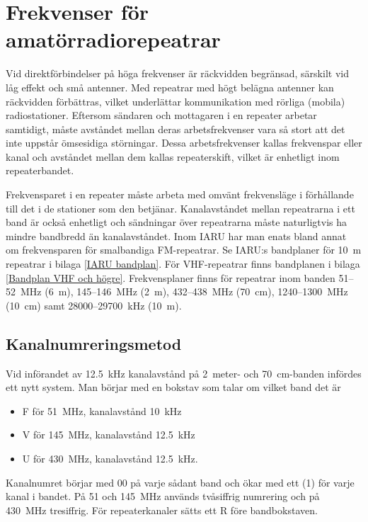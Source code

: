 \chapter[Svenska repeatrar]{Frekvenser för amatörradiorepeatrar}
\label{svenska repeatrar}

Vid direktförbindelser på höga frekvenser är räckvidden begränsad,
särskilt vid låg effekt och små antenner.
Med repeatrar med högt belägna antenner kan räckvidden förbättras,
vilket underlättar kommunikation med rörliga (mobila) radiostationer.
Eftersom sändaren och mottagaren i en repeater arbetar samtidigt, måste
avståndet mellan deras arbetsfrekvenser vara så stort att det inte uppstår
ömsesidiga störningar.
Dessa arbetsfrekvenser kallas frekvenspar eller kanal och avståndet mellan dem
kallas repeaterskift, vilket är enhetligt inom repeaterbandet.

Frekvensparet i en repeater måste arbeta med omvänt frekvensläge i förhållande
till det i de stationer som den betjänar.
Kanalavståndet mellan repeatrarna i ett band är också enhetligt och sändningar
över repeatrarna måste naturligtvis ha mindre bandbredd än kanalavståndet.
Inom IARU har man enats bland annat om frekvensparen för smalbandiga
FM-repeatrar.
Se IARU:s bandplaner för 10~m repeatrar i bilaga \ref{IARU bandplan}.
För VHF-repeatrar finns bandplanen i bilaga \ref{Bandplan VHF och högre}.
Frekvensplaner finns för repeatrar inom banden 51--52~MHz (6~m), 145--146~MHz
(2~m), 432--438~MHz (70~cm), 1240--1300~MHz (10~cm) samt 28000--29700~kHz (10~m).

\section{Kanalnumreringsmetod}
Vid införandet av \SI{12,5}{\kilo\hertz} kanalavstånd på 2~meter- och
70~cm-banden infördes ett nytt system.
Man börjar med en bokstav som talar om vilket band det är
\begin{itemize}
  \item F för \SI{51}{\mega\hertz}, kanalavstånd \SI{10}{\kilo\hertz}
  \item V för \SI{145}{\mega\hertz}, kanalavstånd \SI{12,5}{\kilo\hertz}
  \item U för \SI{430}{\mega\hertz}, kanalavstånd \SI{12,5}{\kilo\hertz}.
\end{itemize}
Kanalnumret börjar med 00 på varje sådant band och ökar med ett (1) för varje
kanal i bandet.
På 51 och 145~MHz används tvåsiffrig numrering och på \SI{430}{\mega\hertz}
tresiffrig.
För repeaterkanaler sätts ett R före bandbokstaven.

